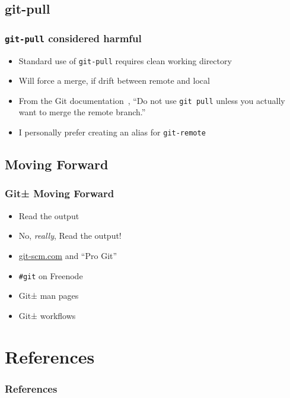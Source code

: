 \documentclass{beamer}
\begin{document}
\subsection{git-pull}
\begin{frame}[fragile]
\frametitle{\texttt{git-pull} considered harmful}
\begin{itemize}
\item{Standard use of \texttt{git-pull} requires clean working directory}
\item{Will force a merge, if drift between remote and local}
\item{From the Git documentation~\cite{website:gitworkflows7}, ``Do not use
\texttt{git pull} unless you actually want to merge the remote branch.''}
\item{I personally prefer creating an alias for \texttt{git-remote}}
\end{itemize}

\end{frame}

\subsection{Moving Forward}
\begin{frame}
\frametitle{Git± Moving Forward}
\begin{itemize}
\item<2->{Read the output}
\item<3->{No, \textit{really}, Read the output!}
\item<4->{\url{git-scm.com} and ``Pro Git''}
\item<5->{\texttt{\#{}git} on Freenode}
\item<6->{Git± man pages~\cite{website:git_man_pages}}
\item<7->{Git± workflows~\cite{website:gitworkflows7}}
\end{itemize}
\end{frame}

\section*{References}
\begin{frame}[allowframebreaks]
\frametitle{References}
\nocite{*}
\renewcommand{\refname}{}


\end{frame}

\end{document}
